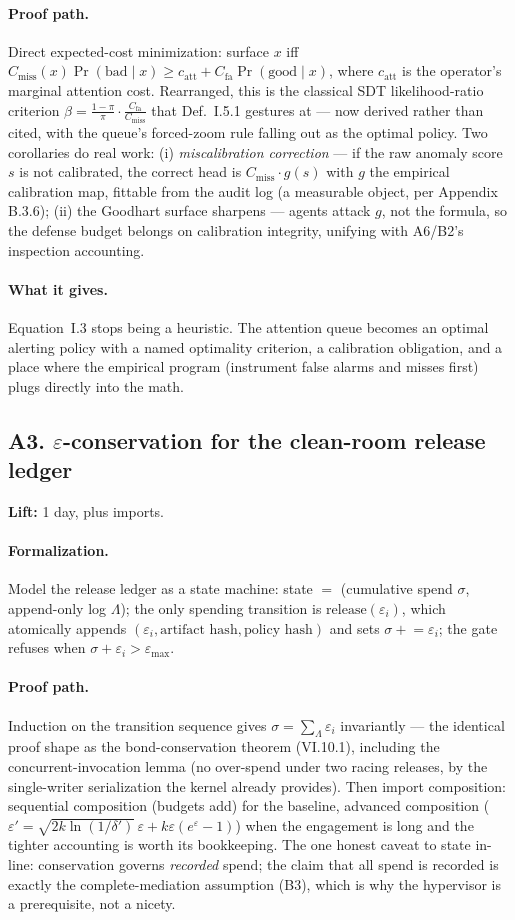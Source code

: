 \documentclass[11pt,a4paper]{article}
\newcommand{\lift}[1]{\noindent\textbf{Lift:} #1.}
\newcommand{\gives}{\paragraph{What it gives.}}
\newcommand{\form}{\paragraph{Formalization.}}
\newcommand{\proofpath}{\paragraph{Proof path.}}
\begin{document}
\proofpath Direct expected-cost minimization: surface $x$ iff $C_{\mathrm{miss}}(x)\Pr(\mathrm{bad}\mid x) \ge c_{\mathrm{att}} + C_{\mathrm{fa}}\Pr(\mathrm{good}\mid x)$, where $c_{\mathrm{att}}$ is the operator's marginal attention cost. Rearranged, this is the classical SDT likelihood-ratio criterion $\beta = \frac{1-\pi}{\pi}\cdot\frac{C_{\mathrm{fa}}}{C_{\mathrm{miss}}}$ that Def.~I.5.1 gestures at --- now derived rather than cited, with the queue's forced-zoom rule falling out as the optimal policy. Two corollaries do real work: (i) \emph{miscalibration correction} --- if the raw anomaly score $s$ is not calibrated, the correct head is $C_{\mathrm{miss}}\cdot g(s)$ with $g$ the empirical calibration map, fittable from the audit log (a measurable object, per Appendix B.3.6); (ii) the Goodhart surface sharpens --- agents attack $g$, not the formula, so the defense budget belongs on calibration integrity, unifying with A6/B2's inspection accounting.

\gives Equation~I.3 stops being a heuristic. The attention queue becomes an optimal alerting policy with a named optimality criterion, a calibration obligation, and a place where the empirical program (instrument false alarms and misses first) plugs directly into the math.

\subsection{A3. $\varepsilon$-conservation for the clean-room release ledger}
\lift{1 day, plus imports}

\form Model the release ledger as a state machine: state $=$ (cumulative spend $\sigma$, append-only log $\Lambda$); the only spending transition is $\mathrm{release}(\varepsilon_i)$, which atomically appends $(\varepsilon_i, \text{artifact hash}, \text{policy hash})$ and sets $\sigma \mathrel{+}= \varepsilon_i$; the gate refuses when $\sigma + \varepsilon_i > \varepsilon_{\max}$.

\proofpath Induction on the transition sequence gives $\sigma = \sum_{\Lambda} \varepsilon_i$ invariantly --- the identical proof shape as the bond-conservation theorem (VI.10.1), including the concurrent-invocation lemma (no over-spend under two racing releases, by the single-writer serialization the kernel already provides). Then import composition: sequential composition (budgets add) for the baseline, advanced composition ($\varepsilon' = \sqrt{2k\ln(1/\delta')}\,\varepsilon + k\varepsilon(e^\varepsilon - 1)$) when the engagement is long and the tighter accounting is worth its bookkeeping. The one honest caveat to state in-line: conservation governs \emph{recorded} spend; the claim that all spend is recorded is exactly the complete-mediation assumption (B3), which is why the hypervisor is a prerequisite, not a nicety.
\end{document}
